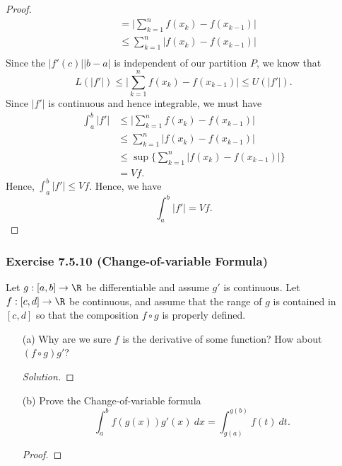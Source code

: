 \begin{enumerate}
\begin{proof}
\begin{align*}
							 &= \Big| \sum_{ k=1 }^{ n } f(x_{k}) - f(x_{k-1})  \Big| \\
							 &\leq \sum_{ k=1 }^{ n } | f(x_{k}) - f(x_{k-1}) | \\ 
		\end{align*}
		Since the \( | f'(c)  | | b -a  |  \) is independent of our partition \( P  \), we know that 
		\[  L(| f' | ) \leq \Big| \sum_{ k=1 }^{ n } f(x_{k}) - f(x_{k-1}) \Big| \leq U(|f' | ). \]
		Since \( | f' |  \) is continuous and hence integrable, we must have
		\begin{align*}
		    \int_{ a }^{ b } | f' | &\leq \Big| \sum_{ k=1 }^{n } f(x_{k}) - f(x_{k-1}) \Big|  \\
									&\leq \sum_{ k=1 }^{ n }| f(x_{k }) - f(x_{k-1})  | \\
									&\leq \sup \Big\{ \sum_{ k=1 }^{ n }| f(x_{k }) - f(x_{k-1})  | \Big\}  \\
									&= Vf.
		\end{align*}
		Hence, \( \int_{ a }^{ b } | f' | \leq Vf \). Hence, we have 
		\[  \int_{ a }^{ b } | f' | = Vf  . \]
		\end{proof}
\end{enumerate}


\subsubsection{Exercise 7.5.10 (Change-of-variable Formula)} Let \( g: [a,b] \to \R  \) be differentiable and assume \( g' \) is continuous. Let \( f: [c,d] \to \R  \) be continuous, and assume that the range of \( g  \) is contained in \( [c,d]  \) so that the composition \( f \circ g  \) is properly defined.
\begin{enumerate}
    \item[(a)] Why are we sure \( f  \) is the derivative of some function? How about \( (f \circ g ) g' \)? 
		\begin{proof}[Solution]
		
		\end{proof}
	\item[(b)] Prove the Change-of-variable formula
		\[  \int_{ a }^{ b } f(g(x)) g'(x) \    dx = \int_{ g(a) }^{ g(b) } f(t) \  dt. \]
		\begin{proof}
		
		\end{proof}
\end{enumerate}


